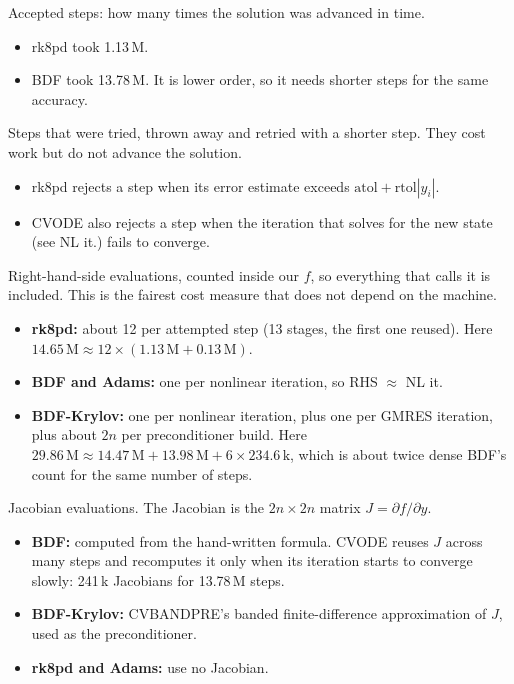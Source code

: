 \documentclass[10pt,a4paper]{article}
\newcommand{\atol}{\mathrm{atol}}
\newcommand{\rtol}{\mathrm{rtol}}
\begin{document}
\begin{description}[style=nextline,leftmargin=1.2cm,itemsep=3pt]
    \item[steps] Accepted steps: how many times the solution was advanced in time.
        \begin{itemize}
            \item rk8pd took 1.13\,M.
            \item BDF took 13.78\,M. It is lower order, so it needs shorter steps for the same accuracy.
        \end{itemize}

    \item[rejected] Steps that were tried, thrown away and retried with a shorter step. They cost work but do not advance the solution.
        \begin{itemize}
            \item rk8pd rejects a step when its error estimate exceeds $\atol+\rtol|y_i|$.
            \item CVODE also rejects a step when the iteration that solves for the new state (see NL it.) fails to converge.
        \end{itemize}

    \item[RHS] Right-hand-side evaluations, counted inside our $f$, so everything that calls it is included. This is the fairest cost measure that does not depend on the machine.
        \begin{itemize}
            \item \textbf{rk8pd:} about 12 per attempted step (13 stages, the first one reused). Here $14.65\,\mathrm M \approx 12\times(1.13\,\mathrm M + 0.13\,\mathrm M)$.
            \item \textbf{BDF and Adams:} one per nonlinear iteration, so RHS $\approx$ NL it.
            \item \textbf{BDF-Krylov:} one per nonlinear iteration, plus one per GMRES iteration, plus about $2n$ per preconditioner build. Here $29.86\,\mathrm M \approx 14.47\,\mathrm M + 13.98\,\mathrm M + 6\times234.6\,\mathrm k$, which is about twice dense BDF's count for the same number of steps.
        \end{itemize}

    \item[Jac.] Jacobian evaluations. The Jacobian is the $2n\times2n$ matrix $J=\partial f/\partial y$.
        \begin{itemize}
            \item \textbf{BDF:} computed from the hand-written formula. CVODE reuses $J$ across many steps and recomputes it only when its iteration starts to converge slowly: 241\,k Jacobians for 13.78\,M steps.
            \item \textbf{BDF-Krylov:} CVBANDPRE's banded finite-difference approximation of $J$, used as the preconditioner.
            \item \textbf{rk8pd and Adams:} use no Jacobian.
        \end{itemize}


\end{description}
\end{document}
